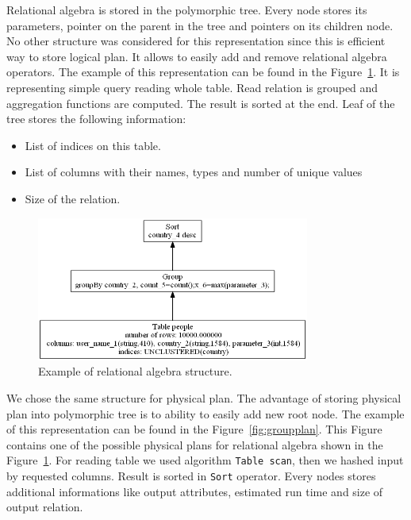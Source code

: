 Relational algebra is stored in the polymorphic tree. Every node stores its parameters, pointer on the parent in the tree and pointers on its children node. No other structure was considered for this representation since this is efficient way to store logical plan. It allows to easily add and remove relational algebra operators.
The example of this representation can be found in the Figure~\ref{fig:groupalgebra}. It is representing simple query reading whole table. Read relation is grouped and aggregation functions are computed. The result is sorted at the end. Leaf of the tree stores the following information:
\begin{itemize}
\item List of indices on this table.
\item List of columns with their names, types and number of unique values
\item Size of the relation.
\end{itemize}
\begin{figure}[h!]
  \centering
    \includegraphics[width=0.8\textwidth]{groupalgebra}

      \caption{Example of relational algebra structure.}
          \label{fig:groupalgebra}
\end{figure}

We chose the same structure for physical plan. The advantage of storing physical plan into polymorphic tree is to ability to easily add new root node. The example of this representation can be found in the Figure~\ref{fig:groupplan}. This Figure contains one of the possible physical plans for relational algebra shown in the Figure~\ref{fig:groupalgebra}. For reading table we used algorithm \texttt{Table scan}, then we hashed input by requested columns. Result is sorted in \texttt{Sort} operator. Every nodes stores additional informations like output attributes, estimated run time and size of output relation.


